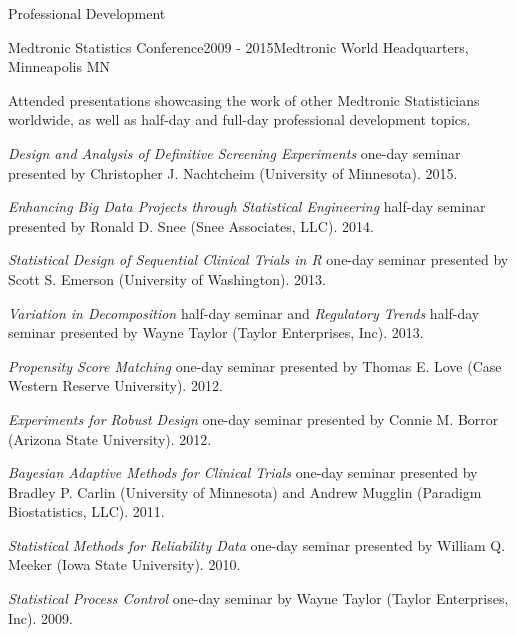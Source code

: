 \documentclass{resume} %
\begin{document}
\begin{rSection}{Professional Development}
		
	\begin{rSubsection}{Medtronic Statistics Conference}{2009 - 2015}{Medtronic World Headquarters, Minneapolis MN}{}
		\item[] Attended presentations showcasing the work of other Medtronic Statisticians worldwide, as well as half-day and full-day professional development topics. \vspace{0.5em}  
		\item[] \textit{Design and Analysis of Definitive Screening Experiments} one-day seminar presented by Christopher J. Nachtcheim (University of Minnesota). 2015. \vspace{0.5em} 
		\item[] \textit{Enhancing Big Data Projects through Statistical Engineering} half-day seminar presented by Ronald D. Snee (Snee Associates, LLC). 2014. \vspace{0.5em}  
		\item[] \textit{Statistical Design of Sequential Clinical Trials in R} one-day seminar presented by Scott S. Emerson (University of Washington). 2013.\vspace{0.5em}  
		\item[] \textit{Variation in Decomposition} half-day seminar and \textit{Regulatory Trends} half-day seminar presented by Wayne Taylor (Taylor Enterprises, Inc). 2013.\vspace{0.5em}  
		\item[] \textit{Propensity Score Matching} one-day seminar presented by Thomas E. Love (Case Western Reserve University). 2012.\vspace{0.5em}  
		\item[] \textit{Experiments for Robust Design} one-day seminar presented by Connie M. Borror (Arizona State University). 2012.\vspace{0.5em}  
		\item[] \textit{Bayesian Adaptive Methods for Clinical Trials} one-day seminar presented by Bradley P. Carlin (University of Minnesota) and Andrew Mugglin (Paradigm Biostatistics, LLC). 2011.\vspace{0.5em}  
		\item[] \textit{Statistical Methods for Reliability Data} one-day seminar presented by William Q. Meeker (Iowa State University). 2010.\vspace{0.5em}  
		\item[] \textit{Statistical Process Control} one-day seminar by Wayne Taylor (Taylor Enterprises, Inc). 2009.\vspace{0.5em}  
		
		
	\end{rSubsection}
		
		
\end{rSection}
\end{document}
